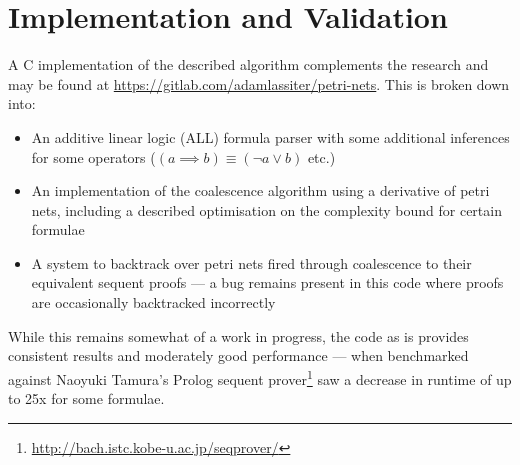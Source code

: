     \section*{Implementation and Validation}
        A C implementation of the described algorithm complements the research and may be found at \url{https://gitlab.com/adamlassiter/petri-nets}.
        This is broken down into:
        \begin{itemize}
            \item An additive linear logic (ALL) formula parser with some additional inferences for some operators ($(a \implies b) \equiv (\neg a \vee b)$ etc.)
            \item An implementation of the coalescence algorithm using a derivative of petri nets, including a described optimisation on the complexity bound for certain formulae
            \item A system to backtrack over petri nets fired through coalescence to their equivalent sequent proofs --- a bug remains present in this code where proofs are occasionally backtracked incorrectly
        \end{itemize}
        While this remains somewhat of a work in progress, the code as is provides consistent results and moderately good performance --- when benchmarked against Naoyuki Tamura's Prolog sequent prover\footnote{\url{http://bach.istc.kobe-u.ac.jp/seqprover/}} saw a decrease in runtime of up to 25x for some formulae.
